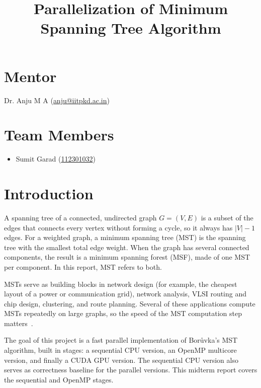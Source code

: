 \documentclass[11pt,a4paper]{article}
\title{\vspace{-1cm}Parallelization of Minimum Spanning Tree Algorithm}
\date{}
\begin{document}
\maketitle
\vspace{-1.5cm}

\section*{Mentor}
Dr. Anju M A (\href{mailto:anju@iitpkd.ac.in}{anju@iitpkd.ac.in})

\section*{Team Members}
\begin{itemize}
  \item Sumit Garad (\href{mailto:112301032@smail.iitpkd.ac.in}{112301032})
\end{itemize}

\section*{Introduction}
A spanning tree of a connected, undirected graph $G=(V,E)$ is a subset of the edges that connects every vertex without forming a cycle, so it always has $|V|-1$ edges. For a weighted graph, a minimum spanning tree (MST) is the spanning tree with the smallest total edge weight. When the graph has several connected components, the result is a minimum spanning forest (MSF), made of one MST per component. In this report, MST refers to both.

MSTs serve as building blocks in network design (for example, the cheapest layout of a power or communication grid), network analysis, VLSI routing and chip design, clustering, and route planning. Several of these applications compute MSTs repeatedly on large graphs, so the speed of the MST computation step matters~\cite{fallin2023eclmst}.

The goal of this project is a fast parallel implementation of Bor\r{u}vka's MST algorithm, built in stages: a sequential CPU version, an OpenMP multicore version, and finally a CUDA GPU version. The sequential CPU version also serves as correctness baseline for the parallel versions. This midterm report covers the sequential and OpenMP stages.

\end{document}
